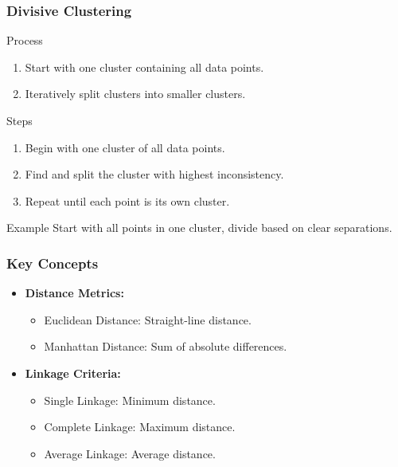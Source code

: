 \documentclass{beamer}
\begin{document}
\begin{frame}[fragile]
    \frametitle{Divisive Clustering}
    \begin{block}{Process}
        \begin{enumerate}
            \item Start with one cluster containing all data points.
            \item Iteratively split clusters into smaller clusters.
        \end{enumerate}
    \end{block}
    
    \begin{block}{Steps}
        \begin{enumerate}
            \item Begin with one cluster of all data points.
            \item Find and split the cluster with highest inconsistency.
            \item Repeat until each point is its own cluster.
        \end{enumerate}
    \end{block}
    
    \begin{block}{Example}
        Start with all points in one cluster, divide based on clear separations.
    \end{block}
\end{frame}

\begin{frame}[fragile]
    \frametitle{Key Concepts}
    \begin{itemize}
        \item \textbf{Distance Metrics:}
        \begin{itemize}
            \item Euclidean Distance: Straight-line distance.
            \item Manhattan Distance: Sum of absolute differences.
        \end{itemize}
        
        \item \textbf{Linkage Criteria:}
        \begin{itemize}
            \item Single Linkage: Minimum distance.
            \item Complete Linkage: Maximum distance.
            \item Average Linkage: Average distance.
        \end{itemize}
    \end{itemize}
\end{frame}
\end{document}
